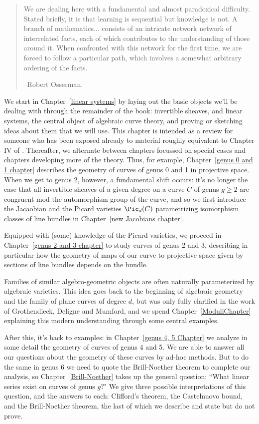 \begin{quote}
\small\sf
We are dealing here with a fundamental and almost paradoxical difficulty. Stated briefly, it is that learning is sequential but knowledge is not. A branch of mathematics... consists of an intricate network network of interrelated facts, each of which contributes to the understanding of those around it. When confronted with this network for the first time, we are forced to follow a particular path, which involves a somewhat arbitrary ordering of the facts.

--Robert Osserman.

\end{quote}

We start in Chapter~\ref{linear systems} by laying out the basic objects we'll be dealing with through the remainder of the book: invertible sheaves, and linear systems, the central object of algebraic curve theory, and proving or sketching ideas about them that we will use. This chapter is intended as a review for someone who has been exposed already to material roughly equivalent to Chapter IV of \cite{H}. Thereafter, we alternate between chapters focussed on special cases and chapters developing more of the theory. Thus, for example, Chapter~\ref{genus 0 and 1 chapter} describes the geometry of curves of genus 0 and 1 in projective space. When we get to genus 2, however, a fundamental shift occurs: it's no longer the case that all invertible sheaves of a given degree on a curve $C$ of genus $g \geq 2$ are congruent mod the automorphism group of the curve, and so we first introduce the Jacaobian and the Picard varieties $\Pic_d(C)$ parametrizing isomorphism classes of line bundles in Chapter~\ref{new Jacobians chapter}.

Equipped with (some) knowledge of the Picard varieties, we proceed in Chapter~\ref{genus 2 and 3 chapter} to study curves of genus 2 and 3, describing in particular how the geometry of maps of our curve to projective space given by sections of line bundles depends on the bundle. 

Families of similar algebro-geometric objects are often naturally parameterized by algebraic varieties. This idea goes back to the beginning of algebraic geometry and the family of plane curves of degree $d$, but was only fully clarified in the work of Grothendieck, Deligne and Mumford, and we spend Chapter~\ref{ModuliChapter} explaining this modern understanding through some central examples.

After this, it's back to examples: in Chapter~\ref{genus 4, 5 Chapter} we analyze in some detail the geometry of curves of genus 4 and 5. We are able to answer all our questions about the geometry of these curves by ad-hoc methods. But to do the same  in genus 6 we need to quote the Brill-Noether theorem to complete our analysis, so Chapter~\ref{Brill-Noether} takes up the general
question: ``What linear series exist on curves of genus $g$?" We give three possible interpretations of this question, and the answers to each: Clifford's theorem, the Castelnuovo bound, and the Brill-Noether theorem, the last of which we describe and state but do not prove.

